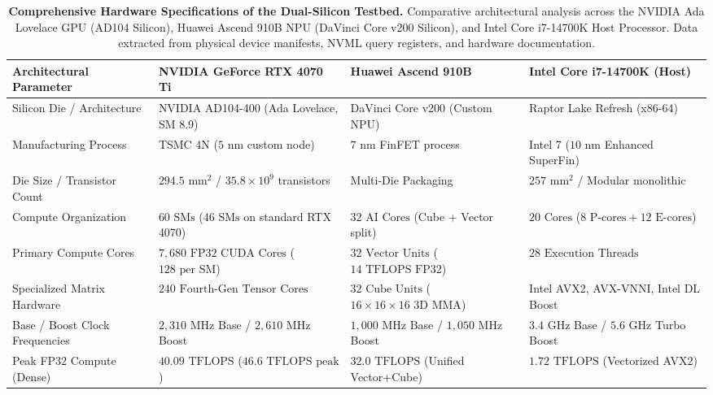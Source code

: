 \begin{table}[!t]
\centering
\scriptsize
\caption[Comprehensive Hardware Specifications of the Dual-Silicon Testbed]{\textbf{Comprehensive Hardware Specifications of the Dual-Silicon Testbed.} Comparative architectural analysis across the NVIDIA Ada Lovelace GPU (AD104 Silicon), Huawei Ascend 910B NPU (DaVinci Core v200 Silicon), and Intel Core i7-14700K Host Processor. Data extracted from physical device manifests, NVML query registers, and hardware documentation.}
\label{tab:hardware_master_specs}
\setlength{\tabcolsep}{4.5pt}
\renewcommand{\arraystretch}{1.15}
\begin{tabularx}{\textwidth}{@{}p{4.2cm}XXX@{}}
\toprule
\textbf{Architectural Parameter} & \textbf{NVIDIA GeForce RTX 4070 Ti} & \textbf{Huawei Ascend 910B} & \textbf{Intel Core i7-14700K (Host)} \\
\midrule
Silicon Die / Architecture & NVIDIA AD104-400 (Ada Lovelace, SM 8.9) & DaVinci Core v200 (Custom NPU) & Raptor Lake Refresh (x86-64) \\
Manufacturing Process & TSMC 4N ($5\text{ nm}$ custom node) & $7\text{ nm}$ FinFET process & Intel 7 ($10\text{ nm}$ Enhanced SuperFin) \\
Die Size / Transistor Count & $294.5\text{ mm}^2$ / $35.8\times 10^9$ transistors & Multi-Die Packaging & $257\text{ mm}^2$ / Modular monolithic \\
\midrule
Compute Organization & $60\text{ SMs}$ ($46\text{ SMs}$ on standard RTX 4070) & $32\text{ AI Cores}$ (Cube + Vector split) & $20\text{ Cores}$ ($8\text{ P-cores} + 12\text{ E-cores}$) \\
Primary Compute Cores & $7{,}680\text{ FP32 CUDA Cores}$ ($128\text{ per SM}$) & $32\text{ Vector Units}$ ($14\text{ TFLOPS FP32}$) & $28\text{ Execution Threads}$ \\
Specialized Matrix Hardware & $240\text{ Fourth-Gen Tensor Cores}$ & $32\text{ Cube Units}$ ($16\times 16\times 16\text{ 3D MMA}$) & Intel AVX2, AVX-VNNI, Intel DL Boost \\
Base / Boost Clock Frequencies & $2{,}310\text{ MHz}$ Base / $2{,}610\text{ MHz}$ Boost & $1{,}000\text{ MHz}$ Base / $1{,}050\text{ MHz}$ Boost & $3.4\text{ GHz}$ Base / $5.6\text{ GHz}$ Turbo Boost \\
\midrule
Peak FP32 Compute (Dense) & $40.09\text{ TFLOPS}$ ($46.6\text{ TFLOPS peak}$) & $32.0\text{ TFLOPS}$ (Unified Vector+Cube) & $1.72\text{ TFLOPS}$ (Vectorized AVX2) \\

\end{tabularx}
\end{table}
